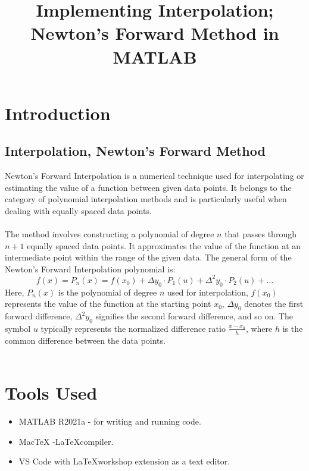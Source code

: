 \clearpage
\title{Implementing Interpolation; Newton's Forward Method in MATLAB }
\author{}
\date{}
\maketitle

\section*{Introduction}
\subsection*{Interpolation, Newton's Forward Method}
Newton's Forward Interpolation is a numerical technique used for interpolating or estimating the value of a function between given data points. It belongs to the category of polynomial interpolation methods and is particularly useful when dealing with equally spaced data points.
\\\\
The method involves constructing a polynomial of degree \(n\) that passes through \(n+1\) equally spaced data points. It approximates the value of the function at an intermediate point within the range of the given data.
The general form of the Newton's Forward Interpolation polynomial is:
\[f(x) = P_n(x) = f(x_0) + \Delta y_0 \cdot P_1(u) + \Delta^2 y_0 \cdot P_2(u) + \ldots\]
Here, \(P_n(x)\) is the polynomial of degree \(n\) used for interpolation, \(f(x_0)\) represents the value of the function at the starting point \(x_0\), \(\Delta y_0\) denotes the first forward difference, \(\Delta^2 y_0\) signifies the second forward difference, and so on. The symbol \(u\) typically represents the normalized difference ratio \(\frac{x - x_0}{h}\), where \(h\) is the common difference between the data points.\\\\


\section*{Tools Used}
\begin{itemize}
    \item MATLAB R2021a - for writing and running code.
    \item MacTeX -\LaTeX  compiler.
    \item VS Code with \LaTeX workshop extension as a text editor.
\end{itemize}

